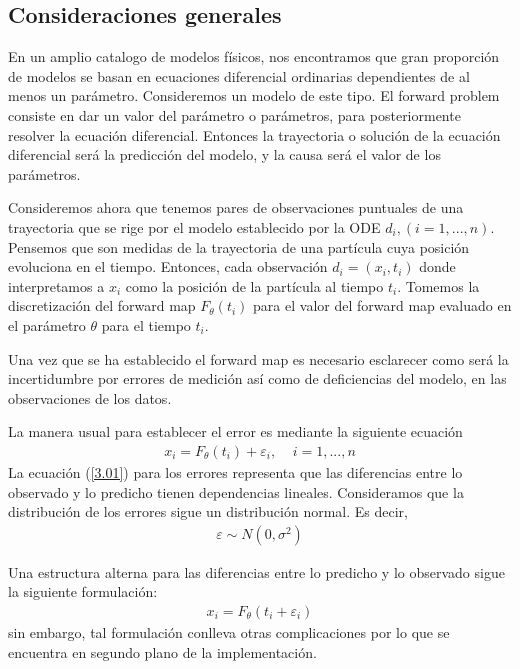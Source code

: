 \documentclass{article}
\begin{document}
\subsection{Consideraciones generales}

En un amplio catalogo de modelos físicos, nos encontramos que gran proporción de modelos se basan en ecuaciones diferencial ordinarias dependientes de al menos un parámetro. Consideremos un modelo de este tipo. El forward problem consiste en dar un valor del parámetro o parámetros, para posteriormente resolver la ecuación diferencial. Entonces la trayectoria o solución de la ecuación diferencial será la predicción del modelo, y la causa será el valor de los parámetros.

Consideremos ahora que tenemos pares de observaciones puntuales de una trayectoria que se rige por el modelo establecido por la ODE $d_i, (i = 1,...,n)$. Pensemos que son medidas de la trayectoria de una partícula cuya posición evoluciona en el tiempo. Entonces, cada observación $d_i = (x_i, t_i)$ donde interpretamos a $x_i$ como la posición de la partícula al tiempo $t_i$. Tomemos la discretización del forward map $F_\theta(t_i)$ para el valor del forward map evaluado en el parámetro $\theta$ para el tiempo $t_i$. 


Una vez que se ha establecido el forward map es necesario esclarecer como será la incertidumbre por errores de medición así como de deficiencias del modelo, en las observaciones de los datos. 

La manera usual para establecer el error es mediante la siguiente ecuación
\begin{align}
    x_i = F_\theta (t_i) + \varepsilon_i, \:\:\:\:\: i = 1,...,n
    \label{3.01}
\end{align}
La ecuación (\ref{3.01}) para los errores representa que las diferencias entre lo observado y lo predicho tienen dependencias lineales. Consideramos que la distribución de los errores sigue un distribución normal. Es decir,
\begin{align}
    \varepsilon \sim N(0,\sigma^2)
    \label{3.02}
\end{align}

Una estructura alterna para las diferencias entre lo predicho y lo observado sigue la siguiente formulación:
\begin{align*}
    x_i = F_{\theta}(t_i + \varepsilon_i)
\end{align*}
sin embargo, tal formulación conlleva otras complicaciones por lo que se encuentra en segundo plano de la implementación.
\end{document}
